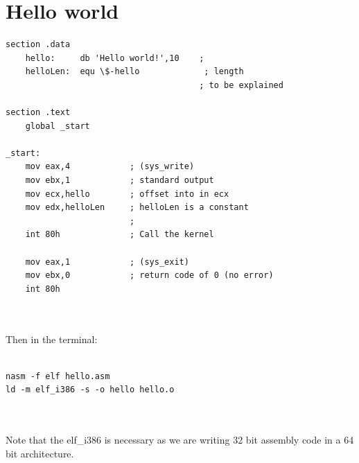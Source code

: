\documentclass[10pt,a4paper]{book}
\begin{document}
\section{Hello world}
\begin{verbatim}
section .data
	hello:     db 'Hello world!',10    ; 
	helloLen:  equ \$-hello             ; length 
	                                   ; to be explained

section .text
	global _start

_start:
	mov eax,4            ; (sys_write)
	mov ebx,1            ; standard output
	mov ecx,hello        ; offset into in ecx
	mov edx,helloLen     ; helloLen is a constant
	                     ;  
	int 80h              ; Call the kernel

	mov eax,1            ; (sys_exit)
	mov ebx,0            ; return code of 0 (no error)
	int 80h
\end{verbatim}
\\\\
Then in the terminal:\\\\
\begin{verbatim}
nasm -f elf hello.asm
ld -m elf_i386 -s -o hello hello.o
\end{verbatim}
\\\\
Note that the elf\_i386 is necessary as we are writing 32 bit assembly code in a 64 bit architecture.
\newpage
\end{document}
